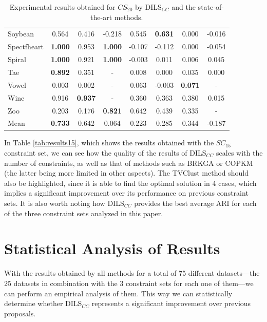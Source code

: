 \documentclass[review]{elsarticle}
\begin{document}
\begin{table}[!h]
{\begin{tabular}{lccccccc}
			Soybean & 0.564 & 0.416 & -0.218 & 0.545 & \textbf{0.631} & 0.000 & -0.016 \\
			Spectfheart & \textbf{1.000} & 0.953 & \textbf{1.000} & -0.107 & -0.112 & 0.000 & -0.054 \\
			Spiral & \textbf{1.000} & 0.921 & \textbf{1.000} & -0.003 & 0.011 & 0.006 & 0.045 \\
			Tae & \textbf{0.892} & 0.351 & - & 0.008 & 0.000 & 0.035 & 0.000 \\
			Vowel & 0.003 & 0.002 & - & 0.063 & -0.003 & \textbf{0.071} & - \\
			Wine & 0.916 & \textbf{0.937} & - & 0.360 & 0.363 & 0.380 & 0.015 \\
			Zoo & 0.203 & 0.176 & \textbf{0.821} & 0.642 & 0.439 & 0.335 & - \\
			\hline
			Mean & \textbf{0.733} & 0.642 & 0.064 & 0.223 & 0.285 & 0.344 & -0.187 \\
			\hline
			
		\end{tabular}}
		
	\caption{Experimental results obtained for $CS_{20}$ by DILS$_{CC}$ and the state-of-the-art methods.}
	\label{tab:results20}
\end{table}
	
In Table \ref{tab:results15}, which shows the results obtained with the $SC_{15}$ constraint set, we can see how the quality of the results of DILS$_{CC}$ scales with the number of constraints, as well as that of methods such as BRKGA or COPKM (the latter being more limited in other aspects). The TVClust method should also be highlighted, since it is able to find the optimal solution in 4 cases, which implies a significant improvement over its performance on previous constraint sets. It is also worth noting how DILS$_{CC}$ provides the best average ARI for each of the three constraint sets analyzed in this paper.
	
	
\clearpage

\section{Statistical Analysis of Results} \label{sec:analisis}

With the results obtained by all methods for a total of 75 different datasets---the 25 datasets in combination with the 3 constraint sets for each one of them---we can perform an empirical analysis of them. This way we can statistically determine whether DILS$_{CC}$ represents a significant improvement over previous proposals.
\end{document}
